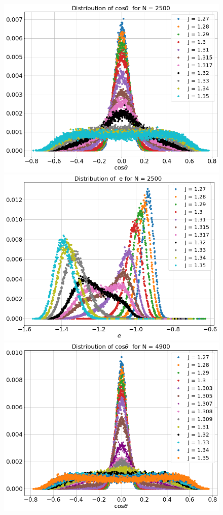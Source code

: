\begin{figure}[H]
 	\includegraphics[scale=0.25]{Images/distr_cos_2500.png}
 	\includegraphics[scale=0.25]{Images/distr_energy_2500.png}
 	\\
 	\includegraphics[scale=0.25]{Images/distr_cos_4900.png}

\end{figure}
